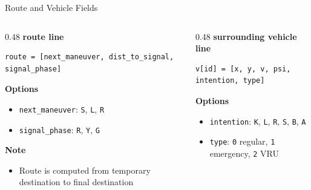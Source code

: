 \documentclass[aspectratio=169]{beamer}
\begin{document}
\begin{frame}[fragile]{Route and Vehicle Fields}
\begin{columns}[T]
    \begin{column}{0.48\textwidth}
        \textbf{route line}
        \begin{lstlisting}[style=codestyle]
route = [next_maneuver, dist_to_signal, signal_phase]
        \end{lstlisting}

        \textbf{Options}
        \begin{itemize}
            \item \texttt{next\_maneuver}: \texttt{S}, \texttt{L}, \texttt{R}
            \item \texttt{signal\_phase}: \texttt{R}, \texttt{Y}, \texttt{G}
        \end{itemize}

        \textbf{Note}
        \begin{itemize}
            \item Route is computed from temporary destination to final destination
        \end{itemize}
    \end{column}
    \begin{column}{0.48\textwidth}
        \textbf{surrounding vehicle line}
        \begin{lstlisting}[style=codestyle]
v[id] = [x, y, v, psi, intention, type]
        \end{lstlisting}

        \textbf{Options}
        \begin{itemize}
            \item \texttt{intention}: \texttt{K}, \texttt{L}, \texttt{R}, \texttt{S}, \texttt{B}, \texttt{A}
            \item \texttt{type}: \texttt{0} regular, \texttt{1} emergency, \texttt{2} VRU
        \end{itemize}
    \end{column}
\end{columns}
\end{frame}
\end{document}
